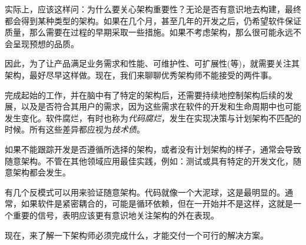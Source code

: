 
实际上，应该这样问：为什么要关心架构重要性？无论是否有意识地去构建，最终都会得到某种类型的架构。如果在几个月，甚至几年的开发之后，仍希望软件保证质量，那么需要在过程的早期采取一些措施。如果不考虑架构，那么很可能永远不会呈现预想的品质。

因此，为了让产品满足业务需求和性能、可维护性、可扩展性(等)，就需要关注其架构，最好尽早这样做。现在，我们来聊聊优秀架构师不能接受的两件事。


完成起始的工作，并在脑中有了特定的架构后，还需要持续地控制架构后续的发展，以及是否符合其用户的需求，因为这些需求在软件的开发和生命周期中也可能发生变化。软件腐烂，有时也称为\textit{代码腐烂}，发生在实现决策与计划架构不匹配的时候。所有这些差异都应视为\textit{技术债}。


如果不能跟踪开发是否遵循所选择的架构，或者没有计划架构的样子，通常会导致随意架构。不管在其他领域应用最佳实践，例如：测试或具有特定的开发文化，随意架构都会发生。

有几个反模式可以用来验证随意架构。代码就像一个大泥球，这是最明显的。通常，如果软件是紧密耦合的，可能是循环依赖，但在一开始并不是这样，这就是一个重要的信号，表明应该更有意识地关注架构的外在表现。

现在，来了解一下架构师必须完成什么，才能交付一个可行的解决方案。









